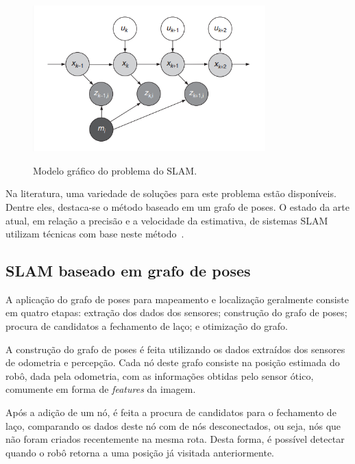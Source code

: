 \documentclass[repeatfields,xlists,xpacks,oneside,yearsonly]{ufrgscca}
\begin{document}
\begin{figure}[h]
    {
        \centering
        \caption{Modelo gráfico do problema do SLAM.}
        \label{fig:slam_algo}
        \includegraphics[width=0.8\textwidth]{graphic_slam_representation.png}\\
    }
    {}
\end{figure}

Na literatura, uma variedade de soluções para este problema estão
disponíveis. Dentre eles, destaca-se o método baseado em um grafo de
poses. O estado da arte atual, em relação a precisão e a velocidade
da estimativa, de sistemas SLAM utilizam técnicas com base neste
método~\cite{graph_slam_tutorial}.


\subsection{SLAM baseado em grafo de poses}

A aplicação do grafo de poses para mapeamento e localização
geralmente consiste em quatro etapas: extração dos dados dos
sensores; construção do grafo de poses; procura de candidatos a
fechamento de laço; e otimização do grafo.

A construção do grafo de poses é feita utilizando os dados extraídos
dos sensores de odometria e percepção. Cada nó deste grafo consiste
na posição estimada do robô, dada pela odometria, com as informações
obtidas pelo sensor ótico, comumente em forma de \textit{features} da
imagem.

Após a adição de um nó, é feita a procura de candidatos para o
fechamento de laço, comparando os dados deste nó com de nós
desconectados, ou seja, nós que não foram criados recentemente na
mesma rota. Desta forma, é possível detectar quando o robô retorna a
uma posição já visitada anteriormente.
\end{document}
